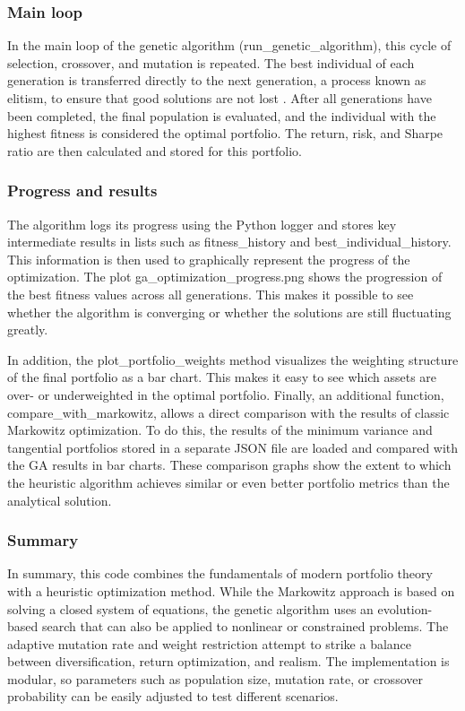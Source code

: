 \documentclass{agasthesis}
\begin{document}
\subsubsection{Main loop}
In the main loop of the genetic algorithm (run_genetic_algorithm), this cycle of selection, crossover, and mutation is repeated. The best individual of each generation is transferred 
directly to the next generation, a process known as elitism, to ensure that good solutions are not lost \cite{deb_fast_2002}. After all generations have been completed, 
the final population is evaluated, and the individual with the highest fitness is considered the optimal portfolio. The return, risk, and Sharpe ratio are then calculated and stored for this portfolio.
\subsubsection{Progress and results}
The algorithm logs its progress using the Python logger and stores key intermediate results in lists such as fitness_history and best_individual_history. 
This information is then used to graphically represent the progress of the optimization. The plot ga_optimization_progress.png shows the progression of the 
best fitness values across all generations. This makes it possible to see whether the algorithm is converging or whether the solutions are still fluctuating greatly.

In addition, the plot_portfolio_weights method visualizes the weighting structure of the final portfolio as a bar chart. This makes it easy to see which assets are over- 
or underweighted in the optimal portfolio. Finally, an additional function, compare_with_markowitz, allows a direct comparison with the results of classic Markowitz optimization. 
To do this, the results of the minimum variance and tangential portfolios stored in a separate JSON file are loaded and compared with the GA results in bar charts. These comparison 
graphs show the extent to which the heuristic algorithm achieves similar or even better portfolio metrics than the analytical solution.
\subsubsection{Summary}
In summary, this code combines the fundamentals of modern portfolio theory with a heuristic optimization method. While the Markowitz approach 
is based on solving a closed system of equations, the genetic algorithm uses an evolution-based search that can also be applied to nonlinear or 
constrained problems. The adaptive mutation rate and weight restriction attempt to strike a balance between diversification, return optimization, 
and realism. The implementation is modular, so parameters such as population size, mutation rate, or crossover probability can be easily adjusted to test different scenarios.
\end{document}
